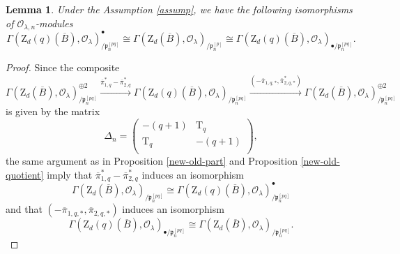\documentclass[10pt]{amsart}
\numberwithin{equation}{section}
\theoremstyle{plain}
\newtheorem{lemma}[theorem]{Lemma}
\numberwithin{equation}{section}
\theoremstyle{definition}
\theoremstyle{remark}
\def\calO{\mathcal{O}}
\def\frakp{\mathfrak{p}}
\def\rmT{\mathrm{T}}
\def\rmZ{\mathrm{Z}}
\begin{document}
\begin{lemma}\label{new-old-def}
Under the Assumption \ref{assump}, we have the following isomorphisms of $\calO_{\lambda, n}$-modules
\begin{equation*}
\Gamma(\rmZ_{d}(q)(\overline{B}), \calO_{\lambda})^{\bullet}_{/\frakp^{[pq]}_{n}}\cong \Gamma(\rmZ_{d}(\overline{B}), \calO_{\lambda})_{/\frakp^{[p]}_{n}}\cong \Gamma(\rmZ_{d}(q)(\overline{B}), \calO_{\lambda})_{\bullet/\frakp^{[pq]}_{n}}.
\end{equation*}
\end{lemma}
\begin{proof}
Since the composite 
\begin{equation*}
\Gamma(\rmZ_{d}(\overline{B}), \calO_{\lambda})^{\oplus2}_{/\frakp^{[pq]}_{n}}\xrightarrow{\overline{\pi}^{\ast}_{1, q}-\overline{\pi}^{\ast}_{2,q}} \Gamma(\rmZ_{d}(q)(\overline{B}), \calO_{\lambda})_{/\frakp^{[pq]}_{n}}\xrightarrow{(-\overline{\pi}_{1, q, \ast}, \overline{\pi}^{\ast}_{2, q,\ast})}\Gamma(\rmZ_{d}(\overline{B}), \calO_{\lambda})^{\oplus2}_{/\frakp^{[pq]}_{n}}
\end{equation*}
is given by the matrix 
\begin{equation*}
\Delta_{n}=
\begin{pmatrix}
-(q+1) &   \rmT_{q}\\
\rmT_{q} & -(q+1)\\ 
\end{pmatrix},
\end{equation*}
the same argument as in Proposition \ref{new-old-part} and Proposition \ref{new-old-quotient} imply that $\overline{\pi}^{\ast}_{1, q}-\overline{\pi}^{\ast}_{2,q}$ induces an isomorphism
\begin{equation*}
\Gamma(\rmZ_{d}(\overline{B}), \calO_{\lambda})_{/\frakp^{[pq]}_{n}}\cong \Gamma(\rmZ_{d}(q)(\overline{B}), \calO_{\lambda})^{\bullet}_{/\frakp^{[pq]}_{n}}
\end{equation*}
and that $(-\overline{\pi}_{1, q, \ast}, \overline{\pi}_{2, q, \ast})$ induces an isomorphism
\begin{equation*}
\Gamma(\rmZ_{d}(q)(\overline{B}), \calO_{\lambda})_{\bullet/\frakp^{[pq]}_{n}}\cong \Gamma(\rmZ_{d}(\overline{B}), \calO_{\lambda})_{/\frakp^{[pq]}_{n}}.
\end{equation*}
\end{proof}
\end{document}
